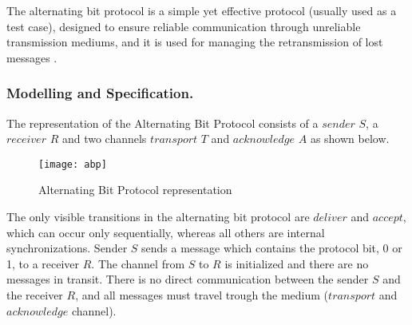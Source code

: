 The alternating bit protocol is a simple yet effective protocol (usually used as a test case), designed to ensure reliable communication through unreliable transmission mediums, and it is used for managing the retransmission of lost messages \cite{ReactiveSystems}\cite{Kulick}.

\subsubsection{Modelling and Specification.}
The representation of the Alternating Bit Protocol consists of a $sender$ $S$, a $receiver$ $R$ and two channels $transport$ $T$ and $acknowledge$ $A$ as shown below. 

\begin{figure}[h]
\centering
\texttt{[image: abp]}
\caption{Alternating Bit Protocol representation}
\label{fig:abp}
\end{figure}

The only visible transitions in the alternating bit protocol are $deliver$ and $accept$, which can occur only sequentially, whereas all others are internal synchronizations. Sender $S$ sends a message which contains the protocol bit, 0 or 1, to a receiver $R$. The channel from $S$ to $R$ is initialized and there are no messages in transit. There is no direct communication between the sender $S$ and the receiver $R$, and all messages must travel trough the medium ($transport$ and $acknowledge$ channel). 

